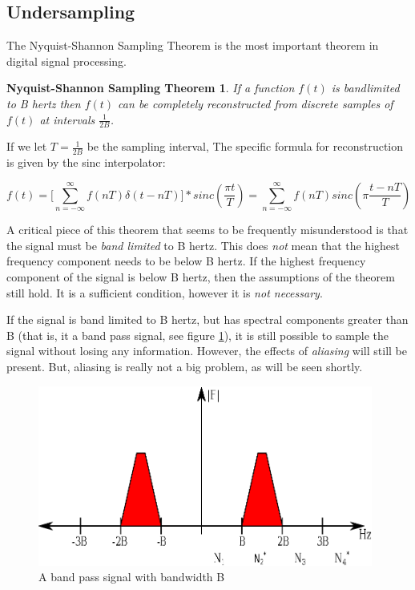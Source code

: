 \documentclass[a4paper, 12pt, notitlepage]{article}
\newtheorem{thm:NSST}{Nyquist-Shannon Sampling Theorem}
\begin{document}
\subsection{Undersampling}
\label{sec:undersampling}
The Nyquist-Shannon Sampling Theorem is the most important theorem in digital signal processing.

\begin{thm:NSST}
\label{thm:NSST}
  If a function $f(t)$ is bandlimited to B hertz then $f(t)$ can be completely reconstructed from discrete samples of $f(t)$ at intervals $\frac{1}{2B}$.
\end{thm:NSST}

If we let $T = \frac{1}{2B}$ be the sampling interval, The specific formula for reconstruction is given by the sinc interpolator:

\begin{equation}
\label{eq:sinc_interpolation}
f(t) = \Big[\sum_{n=-\infty}^{\infty}{f(nT)\delta(t - nT)\Big]}*sinc(\frac{\pi t}{T}) = \sum_{n=-\infty}^{\infty}{f(nT)sinc(\pi\frac{t - nT}{T})}
\end{equation}

A critical piece of this theorem that seems to be frequently misunderstood is that the signal must be \textit{band limited} to B hertz.  This does \textit{not} mean that the highest frequency component needs to be below B hertz.  If the highest frequency component of the signal is below B hertz, then the assumptions of the theorem still hold.  It is a sufficient condition, however it is \textit{not necessary}.

If the signal is band limited to B hertz, but has spectral components greater than B (that is, it a band pass signal, see figure \ref{fig:bandpass_signal}), it is still possible to sample the signal without losing any information.  However, the effects of \textit{aliasing} will still be present.  But, aliasing is really not a big problem, as will be seen shortly.

\begin{figure}[ht]
\caption{A band pass signal with bandwidth B}
\label{fig:bandpass_signal}
\centering
\includegraphics[width=11cm]{images/bandpass_signal.eps}
\end{figure}
\end{document}
